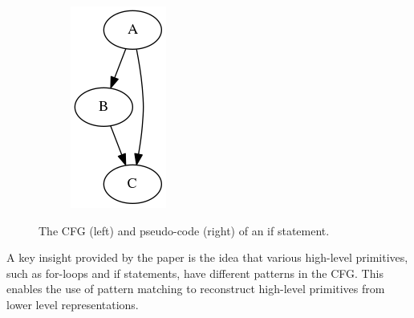 \documentclass[12pt, a4paper]{article}
\begin{document}
\begin{figure}[H]
   \centering
   \begin{subfigure}[b]{0.15\textwidth}
      \includegraphics[width=\textwidth]{inc/if.png}
   \end{subfigure}
   \qquad
   \begin{subfigure}[b]{0.2\textwidth}
      
   \end{subfigure}
   \caption{The CFG (left) and pseudo-code (right) of an if statement.}
\end{figure}

A key insight provided by the paper is the idea that various high-level primitives, such as for-loops and if statements, have different patterns in the CFG. This enables the use of pattern matching to reconstruct high-level primitives from lower level representations.


\end{document}
